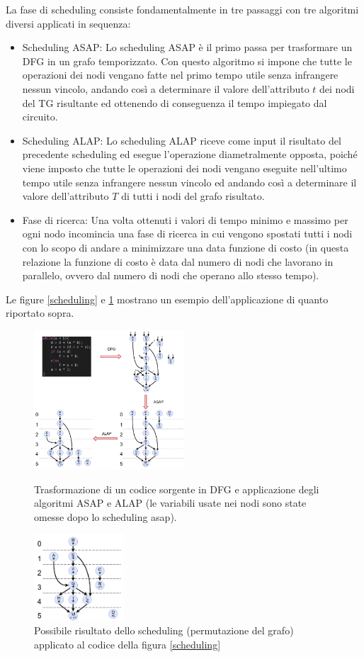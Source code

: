 \documentclass[]{IEEEtran}
\begin{document}
La fase di scheduling consiste fondamentalmente in tre passaggi con tre algoritmi diversi applicati in sequenza:
\begin{itemize}
	\item  Scheduling ASAP: Lo scheduling ASAP è il primo passa per trasformare un DFG in un grafo temporizzato. Con questo algoritmo si impone che tutte le operazioni dei nodi vengano fatte nel primo tempo utile senza infrangere nessun vincolo, andando così a determinare il valore dell'attributo $t$ dei nodi del TG risultante ed ottenendo di conseguenza il tempo impiegato dal circuito.
	\item Scheduling ALAP: Lo scheduling ALAP riceve come input il risultato del precedente scheduling ed esegue l'operazione diametralmente opposta, poiché viene imposto che tutte le operazioni dei nodi vengano eseguite nell'ultimo tempo utile senza infrangere nessun vincolo ed andando così a determinare il valore dell'attributo $T$ di tutti i nodi del grafo risultato.
	\item Fase di ricerca: Una volta ottenuti i valori di tempo minimo e massimo per ogni nodo incomincia una fase di ricerca in cui vengono spostati tutti i nodi con lo scopo di andare a minimizzare una data funzione di costo (in questa relazione la funzione di costo è data dal numero di nodi che lavorano in parallelo, ovvero dal numero di nodi che operano allo stesso tempo).
\end{itemize}
Le figure \ref{scheduling} e \ref{scheduling2} mostrano un esempio dell'applicazione di quanto riportato sopra.
\begin{figure}[htp]
	\centering
	\includegraphics[width=0.5\textwidth]{images/schedule.png}
	\caption{Trasformazione di un codice sorgente in DFG e applicazione degli algoritmi ASAP e ALAP (le variabili usate nei nodi sono state omesse dopo lo scheduling asap).}
	\label{scheduling}
	\includegraphics[width=0.3\textwidth]{images/scheduling2.png}
	\caption{Possibile risultato  dello scheduling (permutazione del grafo) applicato al codice della figura \ref{scheduling}}
	\label{scheduling2}
\end{figure}
\end{document}
